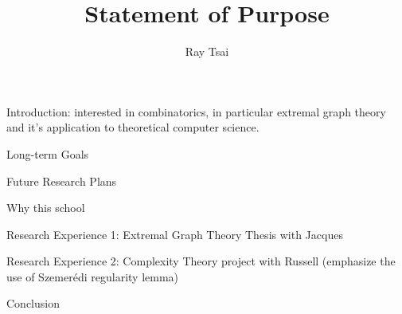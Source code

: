 \documentclass[12pt]{article}
\title{Statement of Purpose}
\author{Ray Tsai}
\date{}
\begin{document}
\maketitle

Introduction: interested in combinatorics, in particular extremal graph theory and it's application
to theoretical computer science.

Long-term Goals

Future Research Plans

Why this school

Research Experience 1: Extremal Graph Theory Thesis with Jacques

Research Experience 2: Complexity Theory project with Russell (emphasize the use of Szemerédi
regularity lemma)

Conclusion
\end{document}
